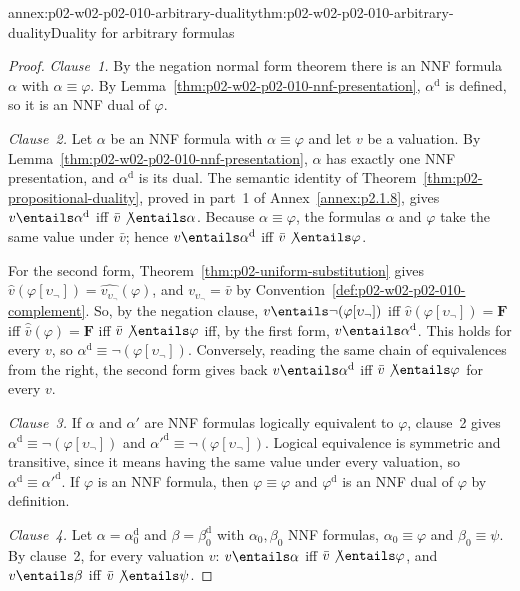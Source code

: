 \begin{annexitem}{annex:p02-w02-p02-010-arbitrary-duality}{thm:p02-w02-p02-010-arbitrary-duality}{Duality for arbitrary formulas}
\begin{proof}
\emph{Clause~1.}  By the negation normal form theorem there is an NNF formula
\(\alpha\) with \(\alpha\equiv\varphi\).  By
Lemma~\ref{thm:p02-w02-p02-010-nnf-presentation}, \(\alpha^{\mathrm d}\) is
defined, so it is an NNF dual of \(\varphi\).

\emph{Clause~2.}  Let \(\alpha\) be an NNF formula with \(\alpha\equiv\varphi\)
and let \(v\) be a valuation.  By
Lemma~\ref{thm:p02-w02-p02-010-nnf-presentation}, \(\alpha\) has exactly one
NNF presentation, and \(\alpha^{\mathrm d}\) is its dual.  The semantic
identity of Theorem~\ref{thm:p02-propositional-duality}, proved in part~1 of
Annex~\ref{annex:p2.1.8}, gives \(v\entails\alpha^{\mathrm d}\) iff
\(\bar v\not\entails\alpha\).  Because \(\alpha\equiv\varphi\), the formulas
\(\alpha\) and \(\varphi\) take the same value under \(\bar v\); hence
\(v\entails\alpha^{\mathrm d}\) iff \(\bar v\not\entails\varphi\).

For the second form, Theorem~\ref{thm:p02-uniform-substitution} gives
\(\widehat v(\varphi[\upsilon_{\neg}])=\widehat{v_{\upsilon_{\neg}}}(\varphi)\),
and \(v_{\upsilon_{\neg}}=\bar v\) by
Convention~\ref{def:p02-w02-p02-010-complement}.  So, by the negation clause,
\(v\entails\neg(\varphi[\upsilon_{\neg}])\) iff
\(\widehat v(\varphi[\upsilon_{\neg}])=\mathbf F\) iff
\(\widehat{\bar v}(\varphi)=\mathbf F\) iff \(\bar v\not\entails\varphi\) iff,
by the first form, \(v\entails\alpha^{\mathrm d}\).  This holds for every
\(v\), so \(\alpha^{\mathrm d}\equiv\neg(\varphi[\upsilon_{\neg}])\).
Conversely, reading the same chain of equivalences from the right, the second
form gives back \(v\entails\alpha^{\mathrm d}\) iff
\(\bar v\not\entails\varphi\) for every \(v\).

\emph{Clause~3.}  If \(\alpha\) and \(\alpha'\) are NNF formulas logically
equivalent to \(\varphi\), clause~2 gives
\(\alpha^{\mathrm d}\equiv\neg(\varphi[\upsilon_{\neg}])\) and
\(\alpha'^{\mathrm d}\equiv\neg(\varphi[\upsilon_{\neg}])\).  Logical
equivalence is symmetric and transitive, since it means having the same value
under every valuation, so \(\alpha^{\mathrm d}\equiv\alpha'^{\mathrm d}\).  If
\(\varphi\) is an NNF formula, then \(\varphi\equiv\varphi\) and
\(\varphi^{\mathrm d}\) is an NNF dual of \(\varphi\) by definition.

\emph{Clause~4.}  Let \(\alpha=\alpha_0^{\mathrm d}\) and
\(\beta=\beta_0^{\mathrm d}\) with \(\alpha_0,\beta_0\) NNF formulas,
\(\alpha_0\equiv\varphi\) and \(\beta_0\equiv\psi\).  By clause~2, for every
valuation \(v\): \(v\entails\alpha\) iff \(\bar v\not\entails\varphi\), and
\(v\entails\beta\) iff \(\bar v\not\entails\psi\).


\end{proof}
\end{annexitem}
